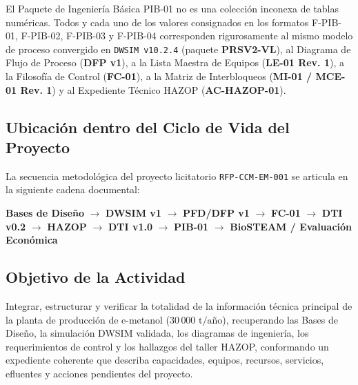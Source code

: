 \documentclass[10pt,letterpaper]{article}
\begin{document}
\begin{tcolorbox}[colframe=navyblue,colback=boxbg,arc=2mm,boxrule=1pt,title=\textbf{Criterio de Ingeniería y Coherencia Multidisciplinar}]
\small
El Paquete de Ingeniería Básica PIB-01 no es una colección inconexa de tablas numéricas. Todos y cada uno de los valores consignados en los formatos F-PIB-01, F-PIB-02, F-PIB-03 y F-PIB-04 corresponden rigurosamente al mismo modelo de proceso convergido en \texttt{DWSIM v10.2.4} (paquete \textbf{PRSV2-VL}), al Diagrama de Flujo de Proceso (\textbf{DFP v1}), a la Lista Maestra de Equipos (\textbf{LE-01 Rev. 1}), a la Filosofía de Control (\textbf{FC-01}), a la Matriz de Interbloqueos (\textbf{MI-01 / MCE-01 Rev. 1}) y al Expediente Técnico HAZOP (\textbf{AC-HAZOP-01}).
\end{tcolorbox}

\subsection{Ubicación dentro del Ciclo de Vida del Proyecto}
La secuencia metodológica del proyecto licitatorio \texttt{RFP-CCM-EM-001} se articula en la siguiente cadena documental:
\begin{center}
\small
\textbf{Bases de Diseño} $\longrightarrow$ \textbf{DWSIM v1} $\longrightarrow$ \textbf{PFD/DFP v1} $\longrightarrow$ \textbf{FC-01} $\longrightarrow$ \textbf{DTI v0.2} $\longrightarrow$ \textbf{HAZOP} $\longrightarrow$ \textbf{DTI v1.0} $\longrightarrow$ \textbf{PIB-01} $\longrightarrow$ \textbf{BioSTEAM / Evaluación Económica}
\end{center}

\subsection{Objetivo de la Actividad}
Integrar, estructurar y verificar la totalidad de la información técnica principal de la planta de producción de e-metanol ($30\,000\text{ t/año}$), recuperando las Bases de Diseño, la simulación DWSIM validada, los diagramas de ingeniería, los requerimientos de control y los hallazgos del taller HAZOP, conformando un expediente coherente que describa capacidades, equipos, recursos, servicios, efluentes y acciones pendientes del proyecto.
\end{document}

